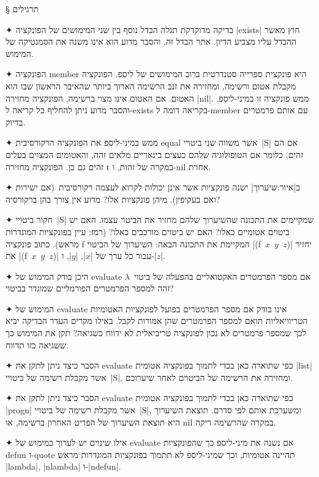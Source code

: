 § תרגילים
\begin{enumerate}
  ✦ בדיקה מדוקדקת תגלה הבדל נוסף בין שני המימושים של הפונקציה \E|exists| חוץ
  מאשר ההבדל עליו מצביע הדיון. אתר הבדל זה, והסבר מדוע הוא אינו משנה את
  הסמנטיקה של המימוש.

  ✦ הפונקציה member היא פונקצית ספרייה סטנדרטית ברוב המימושים של ליספ. הפונקציה
  מקבלת אטום ורשימה, ומחזירה את זנב הרשימה הארוך ביותר שהאיבר הראשון שבו הוא
  האטום. אם האטום אינו מצוי ברשימה, הפונקציה מחזירה \E|nil|. ממש פונקציה זו
  במיני-ליספ, והסבר מדוע ניתן להחליף כל קריאה ל-exists בקריאה דומה
  ל-member עם אותם פרמטרים בדיוק.

  ✦ ממש במיני-ליספ את הפונקציה הרקורסיבית equal אשר משווה שני ביטויי~\E|S| אם
  הם זהים, כלומר אם הטופולוגיה שלהם כעצים בינאריים מלאים זהה, והאטומים המצוים
  בעלים זהים גם כן. הפונקציה מחזירה t במקרה של זהות, ו-nil אחרת.

  ✦ ב|איור:שיערוך| ישנה פונקציות אשר אינן יכולות לקרוא לעצמה רקורסיבית~(אם
  ישירות ואם בעקיפין). מיהן פונקציות אלו? מדוע אין צורך בהן ברקורסיה?

  ✦ חקור ביטויי~\E|S| שמקיימים את התכונה שהשיערוך שלהם מחזיר את הביטוי עצמו. האם
  יש ביטוים אטומיים כאלו? האם יש ביטוים מורכבים כאלו? (רמז: עיין בפונקציות
  המוגדרות מראש). כתוב פונקציה f המקיימת את התכונה הבאה: השיערוך של הביטוי
  \E|(f~$x$~$y$~$z$)| יחזיר את \E|(f~$x$~$y$~$z$)| עבור כל ערך של \E|$x$|,
  \E|$y$|, ו-\E|$z$|.

  ✦ היכן בודק המימוש של evaluate אם מספר הפרמטרים האקטואליים בהפעלה של
  ביטוי~$λ$ זהה למספר הפרמטרים הפורמליים שמוגדר בביטוי?

  ✦ המימוש של evaluate אינו בודק אם מספר הפרמטרים בפועל לפונקציות האטומיות
  הטריוויאליות תואם למספר הפרמטרים שהן אמורות לקבל. באילו מקרים העדר הבדיקה יביא
  לכך שמספר פרמטרים לא נכון לפונקציה טריביאלית לא ידווח כשגיאה? תקן את המימוש
  כך ששגיאה כזו תדווח.

  ✦ הסבר כיצד ניתן לתקן את evaluate כפי שתוארה כאן בכדי לתמוך בפונקציה אטומית
  \E|list| אשר מקבלת רשימה של ביטויי~\E|S|, ומחזירה את הרשימה של הביטוים לאחר
  שיערוכם.

  ✦ הסבר כיצד ניתן לתקן את evaluate כפי שתוארה כאן בכדי לתמוך בפונקציה אטומית
  \E|progn| אשר מקבלת רשימה של ביטויי~\E|S|, ומשערכת אותם לפי סדרם. תוצאת
  השיערוך היא תוצאת השיערוך של הפריט האחרון ברשימה, או nil במקרה שהרשימה ריקה.

  ✦ אילו שינוים יש לערוך במימוש של evaluate אם נשנה את מיני-ליספ כך שהפונקציות
  defun ו-quote תהיינה אטומיות, וכך שמיני-ליספ לא תתמוך בפונקציות המוגדרות
  מראש \E|lambda|, \E|nlambda| ו-\E|ndefun|.


\end{enumerate}
